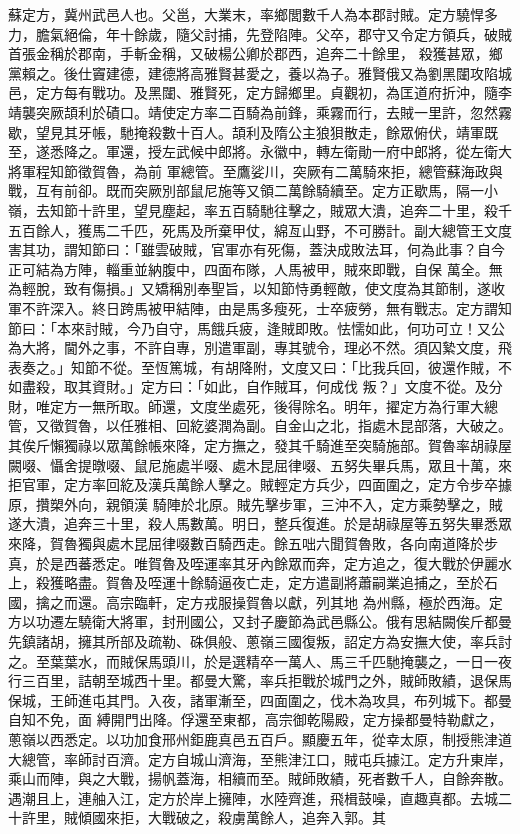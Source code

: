 \begin{pinyinscope}
 蘇定方，冀州武邑人也。父邕，大業末，率鄉閭數千人為本郡討賊。定方驍悍多力，膽氣絕倫，年十餘歲，隨父討捕，先登陷陣。父卒，郡守又令定方領兵，破賊首張金稱於郡南，手斬金稱，又破楊公卿於郡西，追奔二十餘里，
 殺獲甚眾，鄉黨賴之。後仕竇建德，建德將高雅賢甚愛之，養以為子。雅賢俄又為劉黑闥攻陷城邑，定方每有戰功。及黑闥、雅賢死，定方歸鄉里。貞觀初，為匡道府折沖，隨李靖襲突厥頡利於磧口。靖使定方率二百騎為前鋒，乘霧而行，去賊一里許，忽然霧歇，望見其牙帳，馳掩殺數十百人。頡利及隋公主狼狽散走，餘眾俯伏，靖軍既至，遂悉降之。軍還，授左武候中郎將。永徽中，轉左衛勛一府中郎將，從左衛大將軍程知節徵賀魯，為前
 軍總管。至鷹娑川，突厥有二萬騎來拒，總管蘇海政與戰，互有前卻。既而突厥別部鼠尼施等又領二萬餘騎續至。定方正歇馬，隔一小嶺，去知節十許里，望見塵起，率五百騎馳往擊之，賊眾大潰，追奔二十里，殺千五百餘人，獲馬二千匹，死馬及所棄甲仗，綿亙山野，不可勝計。副大總管王文度害其功，謂知節曰：「雖雲破賊，官軍亦有死傷，蓋決成敗法耳，何為此事？自今正可結為方陣，輜重並納腹中，四面布隊，人馬被甲，賊來即戰，自保
 萬全。無為輕脫，致有傷損。」又矯稱別奉聖旨，以知節恃勇輕敵，使文度為其節制，遂收軍不許深入。終日跨馬被甲結陣，由是馬多瘦死，士卒疲勞，無有戰志。定方謂知節曰：「本來討賊，今乃自守，馬餓兵疲，逢賊即敗。怯懦如此，何功可立！又公為大將，閫外之事，不許自專，別遣軍副，專其號令，理必不然。須囚縶文度，飛表奏之。」知節不從。至恆篤城，有胡降附，文度又曰：「比我兵回，彼還作賊，不如盡殺，取其資財。」定方曰：「如此，自作賊耳，何成伐
 叛？」文度不從。及分財，唯定方一無所取。師還，文度坐處死，後得除名。明年，擢定方為行軍大總管，又徵賀魯，以任雅相、回紇婆潤為副。自金山之北，指處木昆部落，大破之。其俟斤懶獨祿以眾萬餘帳來降，定方撫之，發其千騎進至突騎施部。賀魯率胡祿屋闕啜、懾舍提暾啜、鼠尼施處半啜、處木昆屈律啜、五努失畢兵馬，眾且十萬，來拒官軍，定方率回紇及漢兵萬餘人擊之。賊輕定方兵少，四面圍之，定方令步卒據原，攢槊外向，親領漢
 騎陣於北原。賊先擊步軍，三沖不入，定方乘勢擊之，賊遂大潰，追奔三十里，殺人馬數萬。明日，整兵復進。於是胡祿屋等五努失畢悉眾來降，賀魯獨與處木昆屈律啜數百騎西走。餘五咄六聞賀魯敗，各向南道降於步真，於是西蕃悉定。唯賀魯及咥運率其牙內餘眾而奔，定方追之，復大戰於伊麗水上，殺獲略盡。賀魯及咥運十餘騎逼夜亡走，定方遣副將蕭嗣業追捕之，至於石國，擒之而還。高宗臨軒，定方戎服操賀魯以獻，列其地
 為州縣，極於西海。定方以功遷左驍衛大將軍，封刑國公，又封子慶節為武邑縣公。俄有思結闕俟斤都曼先鎮諸胡，擁其所部及疏勒、硃俱般、蔥嶺三國復叛，詔定方為安撫大使，率兵討之。至葉葉水，而賊保馬頭川，於是選精卒一萬人、馬三千匹馳掩襲之，一日一夜行三百里，詰朝至城西十里。都曼大驚，率兵拒戰於城門之外，賊師敗績，退保馬保城，王師進屯其門。入夜，諸軍漸至，四面圍之，伐木為攻具，布列城下。都曼自知不免，面
 縛開門出降。俘還至東都，高宗御乾陽殿，定方操都曼特勒獻之，蔥嶺以西悉定。以功加食邢州鉅鹿真邑五百戶。顯慶五年，從幸太原，制授熊津道大總管，率師討百濟。定方自城山濟海，至熊津江口，賊屯兵據江。定方升東岸，乘山而陣，與之大戰，揚帆蓋海，相續而至。賊師敗績，死者數千人，自餘奔散。遇潮且上，連舳入江，定方於岸上擁陣，水陸齊進，飛楫鼓噪，直趣真都。去城二十許里，賊傾國來拒，大戰破之，殺虜萬餘人，追奔入郭。其

\end{pinyinscope}
